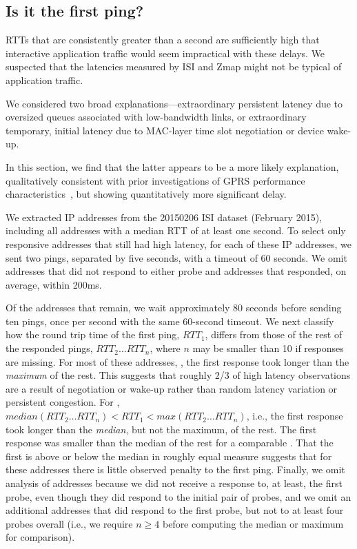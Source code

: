 

\subsection{Is it the first ping?}
\label{subsec:first_ping}

RTTs that are consistently greater than a second are sufficiently
high that interactive application traffic would seem impractical with these
delays.
We suspected that the latencies measured by ISI and Zmap
might not be typical of application traffic.

We considered two broad explanations---extraordinary
persistent latency due to oversized queues associated with
low-bandwidth links, or extraordinary temporary, initial
latency due to MAC-layer time slot negotiation or device
wake-up.

In this section, we find that the latter appears to be a
more likely explanation, qualitatively consistent with prior
investigations of GPRS performance
characteristics~\cite{gprsweb}, but showing quantitatively more significant delay.


We extracted \countInitialList{} IP addresses from the 20150206 ISI 
dataset (February 2015), including all addresses with 
a median RTT of at least one second.   To select only responsive
addresses that still had high latency, for each of these 
IP addresses, we sent two pings, separated by five seconds, 
with a timeout of 60 seconds.   We omit \countUnresponsive{} 
addresses that did not respond to either probe and 
\countNotprobed{} addresses that responded, on average, 
within 200ms.

Of the \countResponsives{} addresses that remain, we 
wait approximately 80 seconds before sending ten pings, 
once per second with the same 60-second timeout.  We 
next classify how the round trip time of the first ping, $RTT_1$, differs from
those of the rest of the responded pings, $RTT_2 \ldots RTT_{n}$, where $n$ may be smaller than 10 if responses are missing.   For most of these addresses,
\countDropsToMedianAndToMax{}, the first
response took longer than the \emph{maximum} of the
rest.  This suggests that roughly 2/3 of high latency
observations are a result of negotiation or wake-up rather
than random latency variation or persistent congestion.
For \countDropsToMedianNotToMax, $median(RTT_2 \ldots RTT_{n}) < RTT_1 < max(RTT_2 \ldots RTT_{n})$, i.e., the first response
took longer than the \emph{median}, but not the maximum, of
the rest.  The first response was smaller than the
median of the rest for a comparable \countNegativeDrop.
That the first is above or below the median in roughly 
equal measure suggests that for these addresses there is 
little observed penalty to the first ping.
Finally, we omit analysis of \countFirstProbeNoResponse{} addresses
because we did not receive a response to, at least, the first probe, even though
they did respond to the initial pair of probes, 
and we omit an additional \countTooFewResponses{} addresses that did
respond to the first probe, but not to at least four probes overall
(i.e., we require $n \geq 4$ before computing the median or maximum
for comparison).

